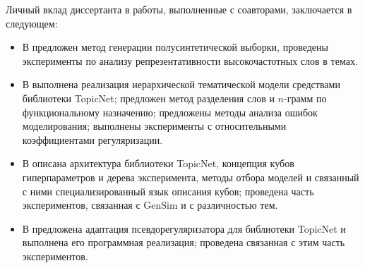 {\contribution} Личный вклад диссертанта в работы, выполненные с
соавторами, заключается в следующем:
\begin{itemize}
    \item В \cite{intracoh} предложен метод генерации полусинтетической выборки, проведены эксперименты по анализу репрезентативности высокочастотных слов в темах.
    \item В \cite{popov_hier} выполнена реализация иерархической тематической модели средствами библиотеки TopicNet; предложен метод разделения слов и $n$-грамм по функциональному назначению; предложены методы анализа ошибок моделирования; выполнены эксперименты с относительными коэффициентами регуляризации.
    \item В \cite{bulatov2020topicnet} описана архитектура библиотеки TopicNet, концепция кубов гиперпараметров и дерева эксперимента, методы отбора моделей и связанный с ними специализированный язык описания кубов; проведена часть экспериментов, связанная с GenSim и с различностью тем.
    \item В \cite{thetaless} предложена адаптация псевдорегуляризатора для библиотеки TopicNet и выполнена его программная реализация; проведена связанная с этим часть экспериментов.
\end{itemize}


